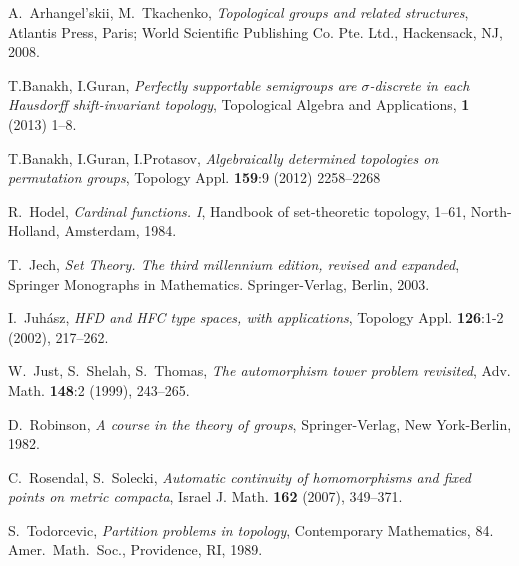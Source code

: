 \documentclass[11pt, twoside]{amsart}
\theoremstyle{definition}
\begin{document}
\begin{thebibliography}{MM}

 A.~Arhangel'skii, M.~Tkachenko, {\em  Topological groups and related structures}, Atlantis Press, Paris; World Scientific Publishing Co. Pte. Ltd., Hackensack, NJ, 2008.

 T.Banakh, I.Guran, {\em Perfectly supportable semigroups are $\sigma$-discrete in each Hausdorff shift-invariant topology}, Topological Algebra and Applications, {\bf 1} (2013) 1--8.

 T.Banakh, I.Guran, I.Protasov, {\em Algebraically determined topologies on permutation groups}, Topology Appl. {\bf 159}:9 (2012) 2258--2268

 R.~Hodel, {\em Cardinal functions. I}, Handbook of set-theoretic topology, 1--61, North-Holland, Amsterdam, 1984.

 T.~Jech, {\em Set Theory. The third millennium edition, revised and expanded}, Springer Monographs in Mathematics. Springer-Verlag, Berlin, 2003.

 I.~Juh\'asz, {\em HFD and HFC type spaces, with applications}, Topology Appl. {\bf 126}:1-2 (2002), 217--262.

 W.~Just, S.~Shelah, S.~Thomas, {\em The automorphism tower problem revisited}, Adv. Math. {\bf 148}:2 (1999), 243--265.

 D.~Robinson, {\em A course in the theory of groups}, Springer-Verlag, New York-Berlin, 1982.

 C.~Rosendal, S.~Solecki, {\em Automatic continuity of homomorphisms and fixed points on metric compacta}, Israel J. Math. {\bf 162} (2007), 349--371.

 S.~Todorcevic, {\em Partition problems in topology}, Contemporary Mathematics, 84. Amer.~Math.~Soc., Providence, RI, 1989.

\end{thebibliography}
\end{document}
